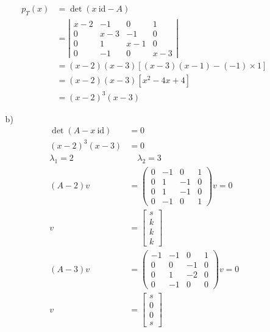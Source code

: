 \documentclass{article}
\begin{document}
\begin{itemize}
\begin{itemize}
        \begin{align*}
            p_T(x)&=\det(x\ \text{id}-A)\\
            &=\left|\begin{matrix}
                x-2&-1&0&1\\
                0&x-3&-1&0\\
                0&1&x-1&0\\
                0&-1&0&x-3
            \end{matrix}\right|\\
            &=(x-2)(x-3)[(x-3)(x-1)-(-1)\times 1]\\
            &=(x-2)(x-3)[x^2-4x+4]\\
            &=(x-2)^3(x-3)
        \end{align*}
        \item [b)]
        \begin{align*}
            \det(A-x\ \text{id})&=0\\
            (x-2)^3(x-3)&=0\\
            \lambda_1=2&\quad\lambda_2=3\\
            (A-2)v&=\begin{pmatrix}
                0&-1&0&1\\
                0&1&-1&0\\
                0&1&-1&0\\
                0&-1&0&1
            \end{pmatrix}v=0\\
            v&=\begin{bmatrix}
                s\\k\\k\\k
            \end{bmatrix}\\
            (A-3)v&=\begin{pmatrix}
                -1&-1&0&1\\
                0&0&-1&0\\
                0&1&-2&0\\
                0&-1&0&0
            \end{pmatrix}v=0\\
            v&=\begin{bmatrix}
                s\\0\\0\\s
            \end{bmatrix}

\end{align*}
\end{itemize}
\end{itemize}
\end{document}
